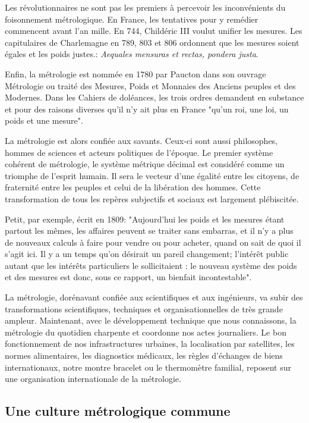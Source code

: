 \documentclass[main.tex]{subfiles}
\begin{document}
Les révolutionnaires ne sont pas les premiers à percevoir les inconvénients du foisonnement métrologique.  En France, les tentatives pour y remédier commencent avant l'an mille.  En 744, Childéric III voulut unifier les mesures.  Les capitulaires de Charlemagne en 789, 803 et 806 ordonnent que les mesures soient égales et les poids justes.: \textit{Aequales mensuras et rectas, pondera justa}.

Enfin, la métrologie est nommée en 1780 par Paucton dans son ouvrage Métrologie ou traité des Mesures, Poids et Monnaies des Anciens peuples et des Modernes.  Dans les Cahiers de doléances, les trois ordres demandent en substance et pour des raisons diverses qu'il n'y ait plus en France "qu'un roi, une loi, un poids et une mesure".

La métrologie est alors confiée aux savants. Ceux-ci sont aussi philosophes, hommes de sciences et acteurs politiques de l'époque.  Le premier système cohérent de métrologie, le système métrique décimal est considéré comme un triomphe de l'esprit humain.  Il sera le vecteur d'une égalité entre les citoyens, de fraternité entre les peuples et celui de la libération des hommes.  Cette transformation de tous les repères subjectifs et sociaux est largement plébiscitée.

Petit, par exemple, écrit en 1809: "Aujourd'hui les poids et les mesures étant partout les mêmes, les affaires peuvent se traiter sans embarras, et il n'y a plus de nouveaux calculs à faire pour vendre ou pour acheter, quand on sait de quoi il s'agit ici. Il y a un temps qu'on désirait un pareil changement; l'intérêt public autant que les intérêts particuliers le sollicitaient : le nouveau système des poids et des mesures est donc, sous ce rapport, un bienfait incontestable".

La métrologie, dorénavant confiée aux scientifiques et aux ingénieurs, va subir des transformations scientifiques, techniques et organisationnelles de très grande ampleur. Maintenant, avec le développement technique que nous connaissons, la métrologie du quotidien charpente et coordonne nos actes journaliers.  Le bon fonctionnement de nos infrastructures urbaines, la localisation par satellites, les normes alimentaires, les diagnostics médicaux, les règles d'échanges de biens internationaux, notre montre bracelet ou le thermomètre familial, reposent sur une organisation internationale de la métrologie.

\subsection{Une culture métrologique commune}
\end{document}
